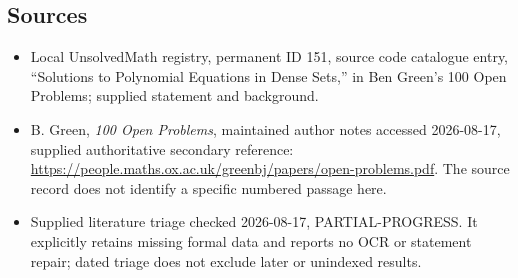 \documentclass[11pt]{article}
\begin{document}
\subsection{Sources}
\begin{itemize}
\item Local UnsolvedMath registry, permanent ID 151, source code catalogue entry, ``Solutions to Polynomial Equations in Dense Sets,'' in Ben Green's 100 Open Problems; supplied statement and background.
\item B. Green, \emph{100 Open Problems}, maintained author notes accessed 2026-08-17, supplied authoritative secondary reference: \url{https://people.maths.ox.ac.uk/greenbj/papers/open-problems.pdf}. The source record does not identify a specific numbered passage here.
\item Supplied literature triage checked 2026-08-17, PARTIAL-PROGRESS. It explicitly retains missing formal data and reports no OCR or statement repair; dated triage does not exclude later or unindexed results.
\end{itemize}
\end{document}
